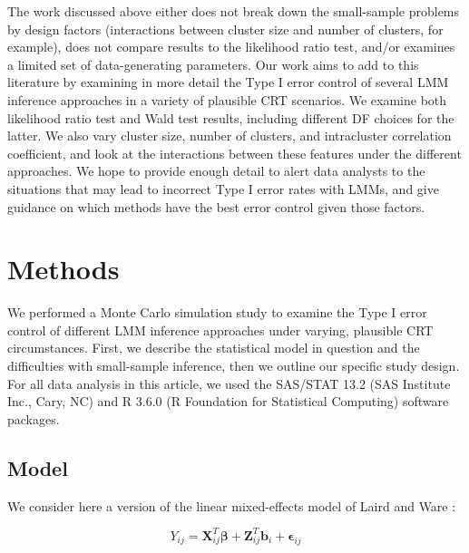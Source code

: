 \documentclass[twocolumn]{bmcart}%
\begin{document}
The work discussed above either does not break down the small-sample problems by design factors (interactions between cluster size and number of clusters, for example), does not compare results to the likelihood ratio test, and/or examines a limited set of data-generating parameters. Our work aims to add to this literature by examining in more detail the Type I error control of several LMM inference approaches in a variety of plausible CRT scenarios. We examine both likelihood ratio test and Wald test results, including different DF choices for the latter. We also vary cluster size, number of clusters, and intracluster correlation coefficient, and look at the interactions between these features under the different approaches. We hope to provide enough detail to alert data analysts to the situations that may lead to incorrect Type I error rates with LMMs, and give guidance on which methods have the best error control given those factors.

\section*{Methods}


We performed a Monte Carlo simulation study to examine the Type I error control of different LMM inference approaches under varying, plausible CRT circumstances. First, we describe the statistical model in question and the difficulties with small-sample inference, then we outline our specific study design. For all data analysis in this article, we used the SAS/STAT 13.2 (SAS Institute Inc., Cary, NC) and R 3.6.0 (R Foundation for Statistical Computing) software packages.

\subsection*{Model}

We consider here a version of the linear mixed-effects model of Laird and Ware \cite{laird_random-effects_1982}:

\begin{equation}
  \label{eq:1}
  Y_{ij} = \mathbf{X}_{ij}^T\boldsymbol{\beta} + \mathbf{Z}_{ij}^T \boldsymbol{b}_i + \mathbf{\epsilon}_{ij}
\end{equation}
\end{document}
